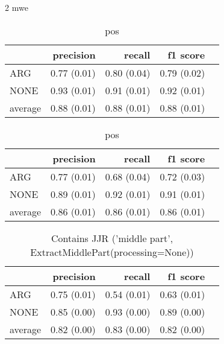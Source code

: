 \begin{table}[!htb]
    \begin{minipage}{.5\linewidth}
      \caption{2 mwe}
      \label{tbl:2_mwe}
      \centering
      
\begin{tabular}{@{}lrrrr@{}}
\toprule
 	&	 precision &	 recall &	 f1 score  \\ \midrule
ARG	&	 0.77 \scriptsize{(0.01)} &	 0.80 \scriptsize{(0.04)} &	 0.79 \scriptsize{(0.02)}  \\
NONE	&	 0.93 \scriptsize{(0.01)} &	 0.91 \scriptsize{(0.01)} &	 0.92 \scriptsize{(0.01)}  \\
average	&	 0.88 \scriptsize{(0.01)} &	 0.88 \scriptsize{(0.01)} &	 0.88 \scriptsize{(0.01)}  \\
\bottomrule
\end{tabular}
  \end{minipage}%
    \begin{minipage}{.5\linewidth}
      \centering
        \caption{pos}
        \label{tbl:2_uni}
\begin{tabular}{@{}lrrrr@{}}
\toprule
 	&	 precision &	 recall &	 f1 score  \\ \midrule
ARG	&	 0.77 \scriptsize{(0.01)} &	 0.68 \scriptsize{(0.04)} &	 0.72 \scriptsize{(0.03)}  \\
NONE	&	 0.89 \scriptsize{(0.01)} &	 0.92 \scriptsize{(0.01)} &	 0.91 \scriptsize{(0.01)}  \\
average	&	 0.86 \scriptsize{(0.01)} &	 0.86 \scriptsize{(0.01)} &	 0.86 \scriptsize{(0.01)}  \\
\bottomrule
\end{tabular}
    \end{minipage} 
\end{table}

\begin{table}[h]
 \centering
 \caption{ Contains JJR ('middle part', ExtractMiddlePart(processing=None)) }
 \label{tbl:2_jjr}
\begin{tabular}{@{}lrrrr@{}}
\toprule
 	&	 precision &	 recall &	 f1 score  \\ \midrule
ARG	&	 0.75 \scriptsize{(0.01)} &	 0.54 \scriptsize{(0.01)} &	 0.63 \scriptsize{(0.01)}  \\
NONE	&	 0.85 \scriptsize{(0.00)} &	 0.93 \scriptsize{(0.00)} &	 0.89 \scriptsize{(0.00)}  \\
average	&	 0.82 \scriptsize{(0.00)} &	 0.83 \scriptsize{(0.00)} &	 0.82 \scriptsize{(0.00)}  \\
\bottomrule
\end{tabular}
\end{table}

